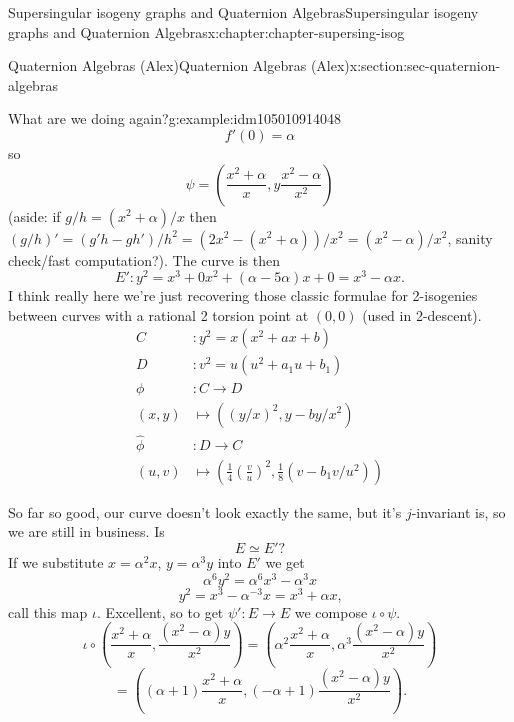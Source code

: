 \documentclass[oneside,10pt,]{book}
\numberwithin{equation}{section}
\newcommand{\amp}{&}
\begin{document}
\begin{chapterptx}{Supersingular isogeny graphs and Quaternion Algebras}{}{Supersingular isogeny graphs and Quaternion Algebras}{}{}{x:chapter:chapter-supersing-isog}
\begin{sectionptx}{Quaternion Algebras (Alex)}{}{Quaternion Algebras (Alex)}{}{}{x:section:sec-quaternion-algebras}
\begin{introduction}{}
\begin{example}{What are we doing again?}{g:example:idm105010914048}
\begin{equation*}
f'(0) = \alpha
\end{equation*}
so%
\begin{equation*}
\psi= \left(\frac{x^2 + \alpha}{x}, y\frac{x^2 - \alpha}{x^2} \right)
\end{equation*}
(aside: if \(g/h = (x^2+\alpha)/x\) then \((g/h)' = (g' h - g h')/h^2 = (2x^2 - (x^2 + \alpha))/x^2 = (x^2 - \alpha)/x^2\), sanity check\slash{}fast computation?). The curve is then%
\begin{equation*}
E'\colon y^2 = x^3 + 0x^2 + (\alpha - 5\alpha)x +0 = x^3  - \alpha x\text{.}
\end{equation*}
I think really here we're just recovering those classic formulae for 2-isogenies between curves with a rational 2 torsion point at \((0,0)\) (used in 2-descent).%
\begin{align*}
C\amp\colon y^2 = x(x^2+ax+b)\\
D\amp\colon v^2 = u(u^2+a_1u+b_1)\\
\phi\amp\colon C\to D\\
(x,y) \amp\mapsto ((y/x)^2 , y-by/x^2)\\
\hat\phi\amp\colon D\to C\\
(u,v) \amp\mapsto \left(\frac14\left(\frac vu\right)^2 ,\frac18( v-b_1 v/u^2)\right)
\end{align*}
%
\par
So far so good, our curve doesn't look exactly the same, but it's \(j\)-invariant is, so we are still in business. Is%
\begin{equation*}
E \simeq E'\text{?}
\end{equation*}
If we substitute \(x= \alpha^2 x\), \(y = \alpha ^3 y\) into \(E'\) we get%
\begin{equation*}
\alpha^6 y^2 = \alpha^6 x^3 - \alpha^3 x
\end{equation*}
%
\begin{equation*}
y^2 = x^3 - \alpha^{-3} x = x^3 +\alpha x\text{,}
\end{equation*}
call this map \(\iota\). Excellent, so to get \(\psi' \colon E\to E\) we compose \(\iota\circ \psi\).%
\begin{equation*}
\iota \circ\left( \frac{x^2  + \alpha}{x}, \frac{(x^2 - \alpha )y}{x^2}\right)  = \left( \alpha^2\frac{x^2  + \alpha}{x}, \alpha^3\frac{(x^2 - \alpha )y}{x^2}\right)
\end{equation*}
%
\begin{equation*}
= \left( (\alpha+  1)\frac{x^2  + \alpha}{x}, ( -\alpha  + 1)\frac{(x^2 - \alpha )y}{x^2}\right)\text{.}
\end{equation*}

\end{example}
\end{introduction}
\end{sectionptx}
\end{chapterptx}
\end{document}
